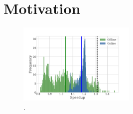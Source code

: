 
\section{Motivation}

\begin{figure}[ht]
    \centering
    \includegraphics[width=0.5\textwidth]{figs/motivation.pdf}
    \caption{.}
    \label{fig:motivation}
\end{figure}
